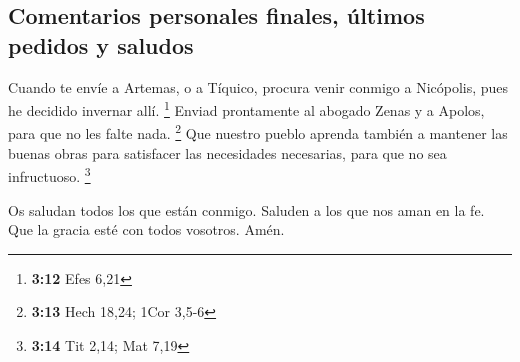 \hypertarget{comentarios-personales-finales-uxfaltimos-pedidos-y-saludos}{%
\subsection{Comentarios personales finales, últimos pedidos y
saludos}\label{comentarios-personales-finales-uxfaltimos-pedidos-y-saludos}}

 Cuando te envíe a Artemas, o a Tíquico, procura venir
conmigo a Nicópolis, pues he decidido invernar allí. \footnote{\textbf{3:12}
  Efes 6,21}  Enviad prontamente al abogado Zenas y a
Apolos, para que no les falte nada. \footnote{\textbf{3:13} Hech 18,24;
  1Cor 3,5-6}  Que nuestro pueblo aprenda también a
mantener las buenas obras para satisfacer las necesidades necesarias,
para que no sea infructuoso. \footnote{\textbf{3:14} Tit 2,14; Mat 7,19}

 Os saludan todos los que están conmigo. Saluden a los
que nos aman en la fe. Que la gracia esté con todos vosotros. Amén.
